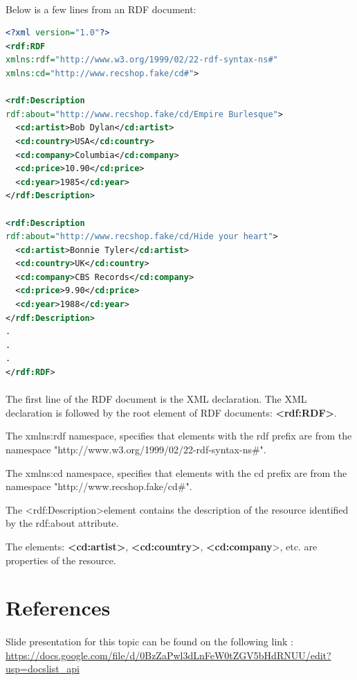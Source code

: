 \documentclass[a4paper,11pt]{report}
\begin{document}
\paragraph{}
Below is a few lines from an RDF document:

\begin{lstlisting}[language=XML]
<?xml version="1.0"?>
<rdf:RDF
xmlns:rdf="http://www.w3.org/1999/02/22-rdf-syntax-ns#"
xmlns:cd="http://www.recshop.fake/cd#">

<rdf:Description
rdf:about="http://www.recshop.fake/cd/Empire Burlesque">
  <cd:artist>Bob Dylan</cd:artist>
  <cd:country>USA</cd:country>
  <cd:company>Columbia</cd:company>
  <cd:price>10.90</cd:price>
  <cd:year>1985</cd:year>
</rdf:Description>

<rdf:Description
rdf:about="http://www.recshop.fake/cd/Hide your heart">
  <cd:artist>Bonnie Tyler</cd:artist>
  <cd:country>UK</cd:country>
  <cd:company>CBS Records</cd:company>
  <cd:price>9.90</cd:price>
  <cd:year>1988</cd:year>
</rdf:Description>
.
.
.
</rdf:RDF> 


\end{lstlisting}
\paragraph{}
The first line of the RDF document is the XML declaration. The XML declaration is followed by the root element of RDF documents: \textbf{\textless rdf:RDF\textgreater}.

The xmlns:rdf namespace, specifies that elements with the rdf prefix are from the namespace "http://www.w3.org/1999/02/22-rdf-syntax-ns\#".

The xmlns:cd namespace, specifies that elements with the cd prefix are from the namespace "http://www.recshop.fake/cd\#".

The \textless rdf:Description\textgreater element contains the description of the resource identified by the rdf:about attribute.

The elements: \textbf{\textless cd:artist\textgreater}, \textbf{\textless cd:country\textgreater}, \textbf{\textless cd:company}\textgreater, etc. are properties of the resource.





\section{References}
\paragraph{}
Slide presentation for this topic can be found on the following link : \url{https://docs.google.com/file/d/0BzZaPwl3dLnFeW0tZGV5bHdRNUU/edit?usp=docslist_api}
\end{document}

